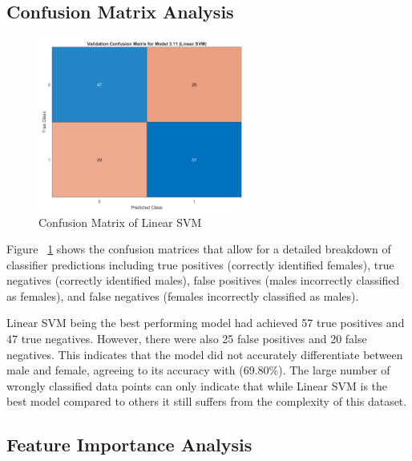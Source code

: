 \subsection{Confusion Matrix Analysis}
\begin{figure}[!htbp]
	\centering
	\includegraphics[width=0.6\textwidth]{figures/confusion-matrix.png}
	\caption{Confusion Matrix of Linear SVM}
	\label{fig:confusion-matrix}
\end{figure}

Figure ~\ref{fig:confusion-matrix} shows the confusion matrices that allow for a detailed breakdown of classifier predictions including true positives (correctly identified females), true negatives (correctly identified males), false positives (males incorrectly classified as females), and false negatives (females incorrectly classified as males).

Linear SVM being the best performing model had achieved 57 true positives and 47 true negatives. However, there were also 25 false positives and 20 false negatives. This indicates that the model did not accurately differentiate  between male and female, agreeing to its accuracy with (69.80\%). The large number of wrongly classified data points can only indicate that while Linear SVM is the best model compared to others it still suffers from the complexity of this dataset. 


\subsection{Feature Importance Analysis}



